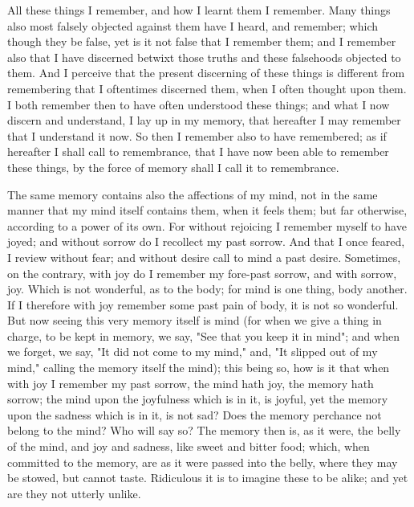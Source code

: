 \documentclass[b5paper,openright,12pt,twoside]{book}
\begin{document}
All these things I remember, and how I learnt them I remember. Many
things also most falsely objected against them have I heard, and
remember; which though they be false, yet is it not false that I
remember them; and I remember also that I have discerned betwixt those
truths and these falsehoods objected to them. And I perceive that the
present discerning of these things is different from remembering that
I oftentimes discerned them, when I often thought upon them. I both
remember then to have often understood these things; and what I now
discern and understand, I lay up in my memory, that hereafter I may
remember that I understand it now. So then I remember also to have
remembered; as if hereafter I shall call to remembrance, that I have now
been able to remember these things, by the force of memory shall I call
it to remembrance.

The same memory contains also the affections of my mind, not in the same
manner that my mind itself contains them, when it feels them; but far
otherwise, according to a power of its own. For without rejoicing I
remember myself to have joyed; and without sorrow do I recollect my
past sorrow. And that I once feared, I review without fear; and without
desire call to mind a past desire. Sometimes, on the contrary, with joy
do I remember my fore-past sorrow, and with sorrow, joy. Which is not
wonderful, as to the body; for mind is one thing, body another. If
I therefore with joy remember some past pain of body, it is not so
wonderful. But now seeing this very memory itself is mind (for when we
give a thing in charge, to be kept in memory, we say, "See that you keep
it in mind"; and when we forget, we say, "It did not come to my mind,"
and, "It slipped out of my mind," calling the memory itself the mind);
this being so, how is it that when with joy I remember my past sorrow,
the mind hath joy, the memory hath sorrow; the mind upon the joyfulness
which is in it, is joyful, yet the memory upon the sadness which is in
it, is not sad? Does the memory perchance not belong to the mind? Who
will say so? The memory then is, as it were, the belly of the mind, and
joy and sadness, like sweet and bitter food; which, when committed to
the memory, are as it were passed into the belly, where they may be
stowed, but cannot taste. Ridiculous it is to imagine these to be alike;
and yet are they not utterly unlike.
\end{document}
